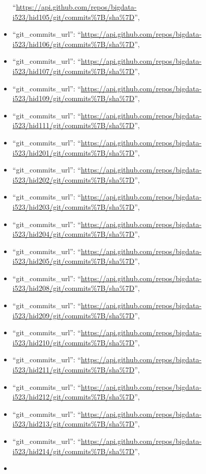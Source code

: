 \begin{itemize}
  ``\url{https://api.github.com/repos/bigdata-i523/hid105/git/commits\%7B/sha\%7D}'',
\item
  ``git\_commits\_url'':
  ``\url{https://api.github.com/repos/bigdata-i523/hid106/git/commits\%7B/sha\%7D}'',
\item
  ``git\_commits\_url'':
  ``\url{https://api.github.com/repos/bigdata-i523/hid107/git/commits\%7B/sha\%7D}'',
\item
  ``git\_commits\_url'':
  ``\url{https://api.github.com/repos/bigdata-i523/hid109/git/commits\%7B/sha\%7D}'',
\item
  ``git\_commits\_url'':
  ``\url{https://api.github.com/repos/bigdata-i523/hid111/git/commits\%7B/sha\%7D}'',
\item
  ``git\_commits\_url'':
  ``\url{https://api.github.com/repos/bigdata-i523/hid201/git/commits\%7B/sha\%7D}'',
\item
  ``git\_commits\_url'':
  ``\url{https://api.github.com/repos/bigdata-i523/hid202/git/commits\%7B/sha\%7D}'',
\item
  ``git\_commits\_url'':
  ``\url{https://api.github.com/repos/bigdata-i523/hid203/git/commits\%7B/sha\%7D}'',
\item
  ``git\_commits\_url'':
  ``\url{https://api.github.com/repos/bigdata-i523/hid204/git/commits\%7B/sha\%7D}'',
\item
  ``git\_commits\_url'':
  ``\url{https://api.github.com/repos/bigdata-i523/hid205/git/commits\%7B/sha\%7D}'',
\item
  ``git\_commits\_url'':
  ``\url{https://api.github.com/repos/bigdata-i523/hid208/git/commits\%7B/sha\%7D}'',
\item
  ``git\_commits\_url'':
  ``\url{https://api.github.com/repos/bigdata-i523/hid209/git/commits\%7B/sha\%7D}'',
\item
  ``git\_commits\_url'':
  ``\url{https://api.github.com/repos/bigdata-i523/hid210/git/commits\%7B/sha\%7D}'',
\item
  ``git\_commits\_url'':
  ``\url{https://api.github.com/repos/bigdata-i523/hid211/git/commits\%7B/sha\%7D}'',
\item
  ``git\_commits\_url'':
  ``\url{https://api.github.com/repos/bigdata-i523/hid212/git/commits\%7B/sha\%7D}'',
\item
  ``git\_commits\_url'':
  ``\url{https://api.github.com/repos/bigdata-i523/hid213/git/commits\%7B/sha\%7D}'',
\item
  ``git\_commits\_url'':
  ``\url{https://api.github.com/repos/bigdata-i523/hid214/git/commits\%7B/sha\%7D}'',
\item

\end{itemize}
